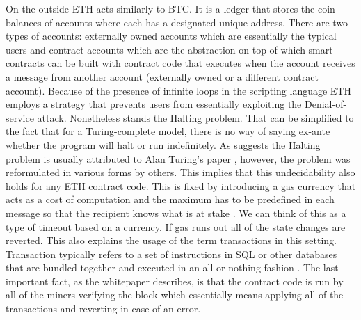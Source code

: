 On the outside \ac{ETH} acts similarly to \ac{BTC}. It is a ledger
that stores the coin balances of accounts where each has a designated unique address.
There are two types of accounts: externally owned accounts which are essentially
the typical users and contract accounts which are the abstraction on top of which
smart contracts can be built with contract code that executes when the account receives
a message from another account (externally owned or a different contract account).
Because of the presence of infinite loops in the scripting language \ac{ETH} employs
a strategy that prevents users from essentially exploiting the Denial-of-service attack.
Nonetheless stands the Halting problem. That can be simplified to the fact
that for a Turing-complete model, there is no way of saying ex-ante whether the program will
halt or run indefinitely. As \cite{Lucas2021} suggests the Halting problem
is usually attributed to Alan Turing's paper 
\cite[On computable numbers, with an application to the Entscheidungsproblem]{turing1936computable},
however, the problem was reformulated in various forms by others. This implies
that this undecidability also holds for any \ac{ETH} contract code.
This is fixed by introducing a gas currency that acts as a cost of computation 
and the maximum has to be predefined in each 
message so that the recipient knows what is at stake \cite{buterin2013ethereum}. 
We can think of this as a type of timeout based on a currency. If gas runs
out all of the state changes are reverted. This also explains the usage 
of the term 
transactions in this setting. 
Transaction typically refers to a set of instructions in SQL or 
other databases that
are bundled together and executed in an all-or-nothing fashion \cite{Kleppmann2017}.
The last important fact, as the whitepaper describes, is that the contract code is run by
all of the miners verifying the block which essentially means applying all of the
transactions and reverting in case of an error.



